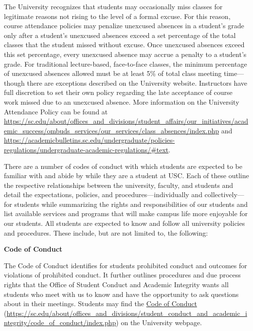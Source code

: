 \documentclass[11pt,letterpaper]{article}
\begin{document}
The University recognizes that students may occasionally miss classes for legitimate reasons not rising to the level of a formal excuse. For this reason, course attendance policies may penalize unexcused absences in a student's grade only after a student's unexcused absences exceed a set percentage of the total classes that the student missed without excuse. Once unexcused absences exceed this set percentage, every unexcused absence may accrue a penalty to a student’s grade. For traditional lecture-based, face-to-face classes, the minimum percentage of unexcused absences allowed must be at least 5\% of total class meeting time---though there are exceptions described on the University website. Instructors have full discretion to set their own policy regarding the late acceptance of course work missed due to an unexcused absence. More information on the University Attendance Policy can be found at \url{https://sc.edu/about/offices_and_divisions/student_affairs/our_initiatives/academic_success/ombuds_services/our_services/class_absences/index.php} and \url{https://academicbulletins.sc.edu/undergraduate/policies-regulations/undergraduate-academic-regulations/\#text}. 
\sectionbreak




There are a number of codes of conduct with which students are expected to be familiar with and abide by while they are a student at USC. Each of these outline the respective relationships between the university, faculty, and students and detail the expectations, policies, and procedures---individually and collectively---for students while summarizing the rights and responsibilities of our students and list available services and programs that will make campus life more enjoyable for our students. All students are expected to know and follow all university policies and procedures. These include, but are not limited to, the following: \pspace

{\bfseries Code of Conduct} \par
The Code of Conduct identifies for students prohibited conduct and outcomes for violations of prohibited conduct. It further outlines procedures and due process rights that the Office of Student Conduct and Academic Integrity wants all students who meet with us to know and have the opportunity to ask questions about in their meetings. Students may find the \href{https://sc.edu/about/offices\_and\_divisions/student\_conduct\_and\_academic\_integrity/code\_of\_conduct/index.php}{Code of Conduct} (\url{https://sc.edu/about/offices\_and\_divisions/student\_conduct\_and\_academic\_integrity/code\_of\_conduct/index.php}) on the University webpage. \pspace
\end{document}
